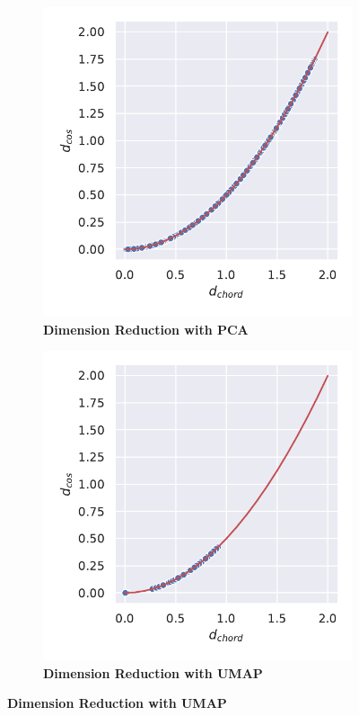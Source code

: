 \begin{figure}[!hbt]
    \centering
    \begin{subfigure}[b]{0.475\textwidth}
        \caption[Dimension Reduction with \Acrshort{PCA}]{\textbf{Dimension Reduction with \Acrshort{PCA}}}
        \label{subfig:Normalisation_PCA}            \includegraphics[width=\textwidth]{PCA/Difference_Distance_Calculation.pdf}
    \end{subfigure}
    \hfill
    \begin{subfigure}[b]{0.475\textwidth}
        \caption[Dimension Reduction with \Acrshort{UMAP}]{\textbf{Dimension Reduction with \Acrshort{UMAP}}}
        \label{subfig:Normalisation_UMAP}            \includegraphics[width=\textwidth]{UMAP/Difference_Distance_Calculation.pdf}

\end{subfigure}
\end{figure}
